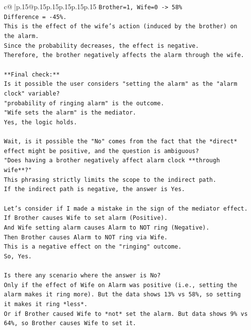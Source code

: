 \documentclass{article}
\begin{document}
{\begin{supertabular}{c@{$\;$}|p{.15\linewidth}@{}p{.15\linewidth}p{.15\linewidth}p{.15\linewidth}p{.15\linewidth}p{.15\linewidth}}
{{{\texttt{Brother=1, Wife=0 {-}> 58\%} \\
\texttt{Difference = {-}45\%.} \\
\texttt{This is the effect of the wife's action (induced by the brother) on the alarm.} \\
\texttt{Since the probability decreases, the effect is negative.} \\
\texttt{Therefore, the brother negatively affects the alarm through the wife.} \\
\\ 
\texttt{**Final check:**} \\
\texttt{Is it possible the user considers "setting the alarm" as the "alarm clock" variable?} \\
\texttt{"probability of ringing alarm" is the outcome.} \\
\texttt{"Wife sets the alarm" is the mediator.} \\
\texttt{Yes, the logic holds.} \\
\\ 
\texttt{Wait, is it possible the "No" comes from the fact that the *direct* effect might be positive, and the question is ambiguous?} \\
\texttt{"Does having a brother negatively affect alarm clock **through wife**?"} \\
\texttt{This phrasing strictly limits the scope to the indirect path.} \\
\texttt{If the indirect path is negative, the answer is Yes.} \\
\\ 
\texttt{Let's consider if I made a mistake in the sign of the mediator effect.} \\
\texttt{If Brother causes Wife to set alarm (Positive).} \\
\texttt{And Wife setting alarm causes Alarm to NOT ring (Negative).} \\
\texttt{Then Brother causes Alarm to NOT ring via Wife.} \\
\texttt{This is a negative effect on the "ringing" outcome.} \\
\texttt{So, Yes.} \\
\\ 
\texttt{Is there any scenario where the answer is No?} \\
\texttt{Only if the effect of Wife on Alarm was positive (i.e., setting the alarm makes it ring more). But the data shows 13\% vs 58\%, so setting it makes it ring *less*.} \\
\texttt{Or if Brother caused Wife to *not* set the alarm. But data shows 9\% vs 64\%, so Brother causes Wife to set it.} \\
}}}
\end{supertabular}}
\end{document}

